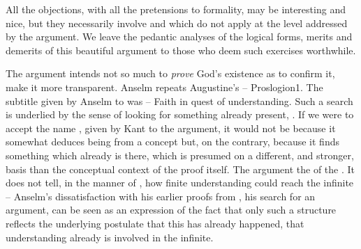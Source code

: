 All the objections, with all the pretensions to formality, may be interesting
and nice, but they necessarily involve  and 
which do not apply at the level addressed by the argument.  We leave the
pedantic analyses of the logical forms, merits and demerits of this beautiful
argument to those who deem such exercises worthwhile.

\pa The argument intends not so much to {\em prove} God's existence as to confirm
it, make it more transparent. Anselm
repeats Augustine's  -- \citet{For I do not seek to
  understand so that I may believe; but I believe so that I may
  understand.}{Proslogion}{1. The subtitle given by Anselm to 
  was  -- Faith in quest of understanding.}
Such a search is underlied by the sense of looking for something already
present, .
If we were to accept the name , given by Kant to the argument,
it would not be because it somewhat deduces being from a concept but, on the
contrary, because it finds something which already is there, which is presumed
on a different, and stronger, basis than the conceptual context of the proof
itself.
%
The argument  the  of the .  It does not
tell, in the manner of  , how finite understanding
could reach the infinite -- Anselm's dissatisfaction with his earlier proofs
from , his search for an  argument, can be seen as
an expression of the fact that only such a structure reflects the underlying
postulate that this has already happened, that understanding already is involved
in the infinite.

